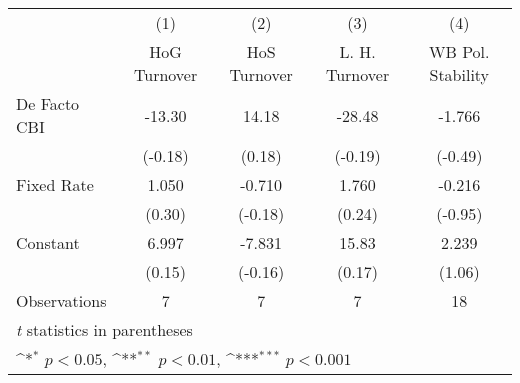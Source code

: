 \begin{table}[htbp]\centering
\def\sym#1{\ifmmode^{#1}\else\(^{#1}\)\fi}
\caption{\label{lowKIfivs4}}
\begin{tabular}{l*{4}{c}}
\toprule
                                        &\multicolumn{1}{c}{(1)}&\multicolumn{1}{c}{(2)}&\multicolumn{1}{c}{(3)}&\multicolumn{1}{c}{(4)}\\
                                        &\multicolumn{1}{c}{HoG Turnover}&\multicolumn{1}{c}{HoS Turnover}&\multicolumn{1}{c}{L. H. Turnover}&\multicolumn{1}{c}{WB Pol. Stability}\\
\midrule
De Facto CBI                            &   -13.30         &    14.18         &   -28.48         &   -1.766         \\
                                        &  (-0.18)         &   (0.18)         &  (-0.19)         &  (-0.49)         \\
\addlinespace
Fixed Rate                              &    1.050         &   -0.710         &    1.760         &   -0.216         \\
                                        &   (0.30)         &  (-0.18)         &   (0.24)         &  (-0.95)         \\
\addlinespace
Constant                                &    6.997         &   -7.831         &    15.83         &    2.239         \\
                                        &   (0.15)         &  (-0.16)         &   (0.17)         &   (1.06)         \\
\midrule
Observations                            &        7         &        7         &        7         &       18         \\
\bottomrule
\multicolumn{5}{l}{\footnotesize \textit{t} statistics in parentheses}\\
\multicolumn{5}{l}{\footnotesize \sym{*} \(p<0.05\), \sym{**} \(p<0.01\), \sym{***} \(p<0.001\)}\\
\end{tabular}
\end{table}
